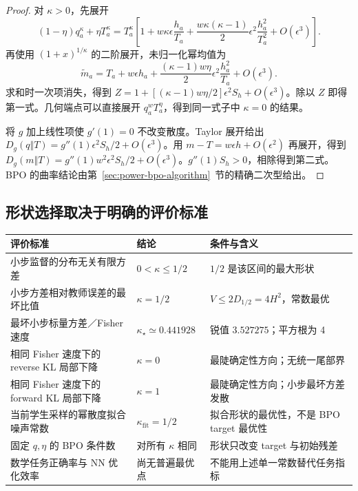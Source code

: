 \begin{proof}
对 $\kappa>0$，先展开
\begin{equation}
 (1-\eta)q_a^\kappa+\eta T_a^\kappa
 =T_a^\kappa\left[1+w\kappa\epsilon\frac{h_a}{T_a}
 +\frac{w\kappa(\kappa-1)}2\epsilon^2\frac{h_a^2}{T_a^2}
 +O(\epsilon^3)\right].
\end{equation}
再使用 $(1+x)^{1/\kappa}$ 的二阶展开，未归一化幂均值为
\begin{equation}
 \widetilde m_a=T_a+w\epsilon h_a
 +\frac{(\kappa-1)w\eta}{2}\epsilon^2\frac{h_a^2}{T_a}+O(\epsilon^3).
\end{equation}
求和时一次项消失，得到 $Z=1+[(\kappa-1)w\eta/2]\epsilon^2S_h+O(\epsilon^3)$。除以 $Z$ 即得第一式。几何端点可以直接展开 $q_a^wT_a^\eta$，得到同一式子中 $\kappa=0$ 的结果。

将 $g$ 加上线性项使 $g'(1)=0$ 不改变散度。Taylor 展开给出 $D_g(q\Vert T)=g''(1)\epsilon^2S_h/2+O(\epsilon^3)$。用 $m-T=w\epsilon h+O(\epsilon^2)$ 再展开，得到 $D_g(m\Vert T)=g''(1)w^2\epsilon^2S_h/2+O(\epsilon^3)$。$g''(1)S_h>0$，相除得到第二式。BPO 的曲率结论由第~\ref{sec:power-bpo-algorithm}~节的精确二次型给出。
\end{proof}

\subsection{形状选择取决于明确的评价标准}

\begin{center}
\small
\begin{tabular}{p{55mm}p{35mm}p{54mm}}
\toprule
评价标准 & 结论 & 条件与含义\\
\midrule
小步监督的分布无关有限方差 & $0<\kappa\le1/2$ & $1/2$ 是该区间的最大形状\\
小步方差相对教师误差的最坏比值 & $\kappa=1/2$ & $V\le2D_{1/2}=4H^2$，常数最优\\
最坏小步标量方差／Fisher 速度 & $\kappa_\star\simeq0.441928$ & 锐值 $3.527275$；平方根为 4\\
相同 Fisher 速度下的 reverse KL 局部下降 & $\kappa=0$ & 最陡确定性方向；无统一尾部界\\
相同 Fisher 速度下的 forward KL 局部下降 & $\kappa=1$ & 最陡确定性方向；小步最坏方差发散\\
当前学生采样的幂散度拟合噪声常数 & $\kappa_{\mathrm{fit}}=1/2$ & 拟合形状的最优性，不是 BPO target 最优性\\
固定 $q,\eta$ 的 BPO 条件数 & 对所有 $\kappa$ 相同 & 形状只改变 target 与初始残差\\
数学任务正确率与 NN 优化效率 & 尚无普遍最优点 & 不能用上述单一常数替代任务指标\\
\bottomrule
\end{tabular}
\end{center}

